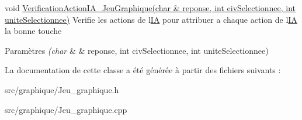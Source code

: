 void \hyperlink{classJeu__graphique_ac5ea38ecd12b46fee29ba7967a1b1a55}{Verification\+Action\+I\+A\+\_\+\+Jeu\+Graphique(char \& reponse, int civ\+Selectionnee, int unite\+Selectionnee)} Verifie les actions de l\textquotesingle{}\hyperlink{classIA}{IA} pour attribuer a chaque action de l\textquotesingle{}\hyperlink{classIA}{IA} la bonne touche 


\begin{DoxyParams}{Paramètres}
{\em (char} & \& reponse, int civ\+Selectionnee, int unite\+Selectionnee) \\
\hline
\end{DoxyParams}


La documentation de cette classe a été générée à partir des fichiers suivants \+:\begin{DoxyCompactItemize}
\item 
src/graphique/Jeu\+\_\+graphique.\+h\item 
src/graphique/Jeu\+\_\+graphique.\+cpp\end{DoxyCompactItemize}
